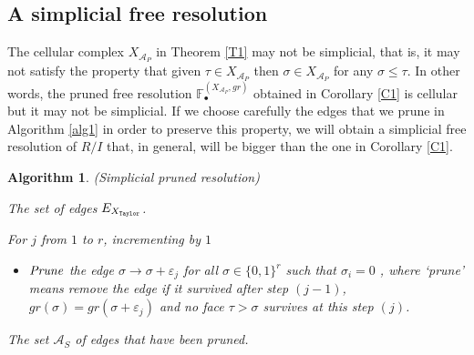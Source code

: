 \documentclass[12pt]{amsart}
\newtheorem{algorithm}[theorem]{Algorithm}
\theoremstyle{definition}
\theoremstyle{remark}
\numberwithin{equation}{section}
\newcommand{\cA}{{\mathcal A}}
\newcommand{\lra}{{\longrightarrow}}
\newcommand{\phil}[1]{{\color{red} \sf $\star\star$ Philippe: [#1]}}
\begin{document}
\subsection{A simplicial free resolution} \label{simplicial1}
The cellular complex $X_{\cA_P}$ in Theorem \ref{T1} may not be simplicial, that is, it may not satisfy the property that
 given $\tau \in X_{\cA_P}$ then  $\sigma\in X_{\cA_P}$ for any $\sigma \leq \tau$.
In other words,
the pruned free resolution $\mathbb{F}_{\bullet}^{(X_{\cA_P},gr)}$
obtained in Corollary \ref{C1} is cellular but it may not be simplicial.
If we choose carefully the edges that we prune in  Algorithm
\ref{alg1} in order to preserve this property,  we will obtain a
simplicial free resolution of $R/I$ that, in general, will be bigger than the one in Corollary \ref{C1}.

\vskip 2mm

\begin{algorithm}\label{alg3} { (Simplicial pruned resolution)}
\vskip 2mm

{\rm {} The set of edges $E_{X_{\tt Taylor}}$.


\vskip 2mm



For $j$ from $1$ to $r$, incrementing by $1$

\vskip 2mm

\begin{itemize}

\item[\textbf{(j)}] ${\it Prune}$ the edge ${\sigma} \lra{\sigma + \varepsilon_j}$ for
all $\sigma \in \{0,1\}^r$ such that $\sigma_i=0$ , where `prune'
means remove the edge if it survived after step $(j-1)$,
$gr(\sigma)=gr(\sigma + \varepsilon_j) $ and no
face $\tau > \sigma$ survives at this step $(j)$.

\end{itemize}}

\vskip 2mm


 The set $\cA_S$ of edges that have been pruned.

\end{algorithm}
\end{document}
